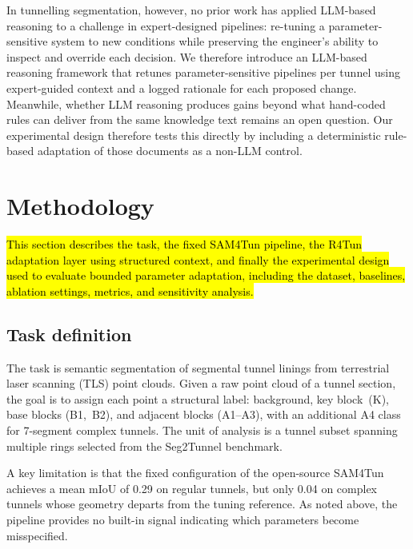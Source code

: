 \documentclass[a4paper,fleqn]{cas-dc}
\begin{document}
In tunnelling segmentation, however, no prior work has applied LLM-based reasoning to a challenge in expert-designed pipelines: re-tuning a parameter-sensitive system to new conditions while preserving the engineer's ability to inspect and override each decision. We therefore introduce an LLM-based reasoning framework that retunes parameter-sensitive pipelines per tunnel using expert-guided context and a logged rationale for each proposed change. Meanwhile, whether LLM reasoning produces gains beyond what hand-coded rules can deliver from the same knowledge text remains an open question. Our experimental design therefore tests this directly by including a deterministic rule-based adaptation of those documents as a non-LLM control.




\section{Methodology}\label{sec:methods}

\hl{This section describes the task, the fixed SAM4Tun pipeline, the R4Tun adaptation layer using structured context, and finally the experimental design used to evaluate bounded parameter adaptation, including the dataset, baselines, ablation settings, metrics, and sensitivity analysis.}

\subsection{Task definition}\label{sec:problem-def}

The task is semantic segmentation of segmental tunnel linings from terrestrial laser scanning (TLS) point clouds. Given a raw point cloud of a tunnel section, the goal is to assign each point a structural label: background, key block~(K), base blocks (B1,~B2), and adjacent blocks (A1--A3), with an additional A4 class for 7-segment complex tunnels. The unit of analysis is a tunnel subset spanning multiple rings selected from the Seg2Tunnel benchmark. 

A key limitation is that the fixed configuration of the open-source SAM4Tun achieves a mean mIoU of 0.29 on regular tunnels, but only 0.04 on complex tunnels whose geometry departs from the tuning reference. As noted above, the pipeline provides no built-in signal indicating which parameters become misspecified.
\end{document}
